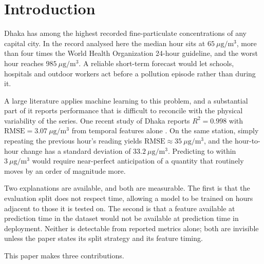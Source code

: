 \documentclass[conference,a4paper]{IEEEtran}
\begin{document}
\section{Introduction}

Dhaka has among the highest recorded fine-particulate concentrations of any
capital city. In the record analysed here the median hour sits at
$65~\mu\mathrm{g/m^3}$, more than four times the World Health Organization
24-hour guideline, and the worst hour reaches $985~\mu\mathrm{g/m^3}$. A reliable
short-term forecast would let schools, hospitals and outdoor workers act before a
pollution episode rather than during it.

A large literature applies machine learning to this problem, and a substantial
part of it reports performance that is difficult to reconcile with the physical
variability of the series. One recent study of Dhaka reports $R^2 = 0.998$ with
$\mathrm{RMSE} = 3.07~\mu\mathrm{g/m^3}$ from temporal features alone
\cite{dhaka_compare}. On the same station, simply repeating the previous hour's reading
yields $\mathrm{RMSE} \approx 35~\mu\mathrm{g/m^3}$, and the hour-to-hour change
has a standard deviation of $33.2~\mu\mathrm{g/m^3}$. Predicting to within
$3~\mu\mathrm{g/m^3}$ would require near-perfect anticipation of a quantity that
routinely moves by an order of magnitude more.

Two explanations are available, and both are measurable. The first is that the
evaluation split does not respect time, allowing a model to be trained on hours
adjacent to those it is tested on. The second is that a feature available at
prediction time in the dataset would not be available at prediction time in
deployment. Neither is detectable from reported metrics alone; both are
invisible unless the paper states its split strategy and its feature timing.

This paper makes three contributions.
\end{document}
